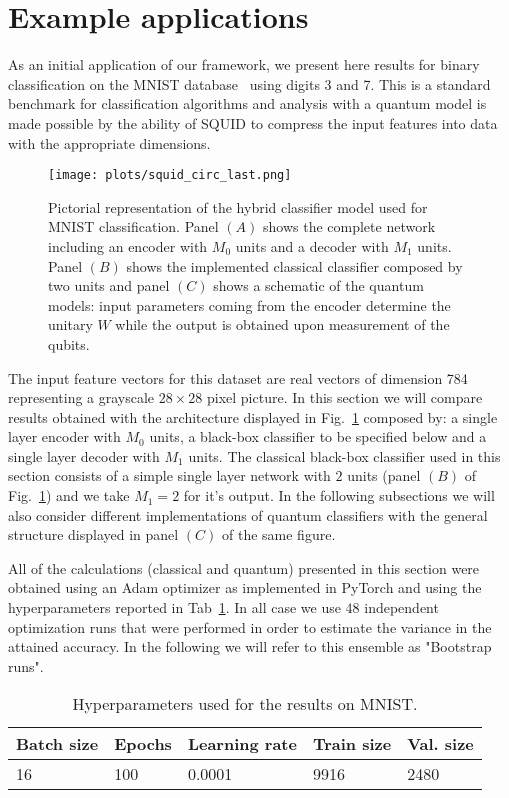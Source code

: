 \section{Example applications}
\label{sec:results}
As an initial application of our framework, we present here results for binary classification on the MNIST database~\cite{MNIST} using digits 3 and 7. This is a standard benchmark for classification algorithms and analysis with a quantum model is made possible by the ability of SQUID to compress the input features into data with the appropriate dimensions.

\begin{figure}[]
	\centering
	 \texttt{[image: plots/squid\_circ\_last.png]}
	\caption{ Pictorial representation of the hybrid classifier model used for MNIST classification. Panel $(A)$ shows the complete network including an encoder with $M_0$ units and a decoder with $M_1$ units. Panel $(B)$ shows the implemented classical classifier composed by two units and panel $(C)$ shows a schematic of the quantum models: input parameters coming from the encoder determine the unitary $W$ while the output is obtained upon measurement of the qubits. }
	\label{fig:mnist_model}
\end{figure}

The input feature vectors for this dataset are real vectors of dimension 784 representing a grayscale $28\times 28$ pixel picture.
In this section we will compare results obtained with the architecture displayed in Fig.~\ref{fig:mnist_model} composed by: a single layer encoder with $M_0$ units, a black-box classifier to be specified below and a single layer decoder with $M_1$ units.
The classical black-box classifier used in this section consists of a simple single layer network with $2$ units (panel $(B)$ of Fig.~\ref{fig:mnist_model}) and we take $M_1=2$ for it's output.
In the following subsections we will also consider different implementations of quantum classifiers with the general structure displayed in panel $(C)$ of the same figure.

All of the calculations (classical and quantum) presented in this section were obtained using an Adam optimizer as implemented in PyTorch and using the hyperparameters reported in Tab~\ref{tab:hyppar}. In all case we use $48$ independent optimization runs that were performed in order to estimate the variance in the attained accuracy. In the following we will refer to this ensemble as "Bootstrap runs".

\begin{table}[]
\footnotesize
\centering
\begin{tabular}{l|l|l|l|l}
Batch size & Epochs & Learning rate & Train size & Val. size\\ \hline
16 & 100 & 0.0001 & 9916 & 2480
\end{tabular}
\caption{Hyperparameters used for the results on MNIST. \label{tab:hyppar}}
\end{table}

